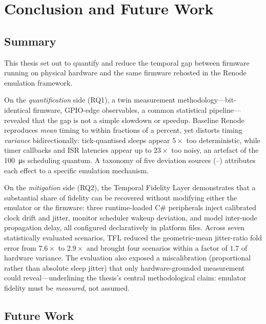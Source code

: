 \chapter{Conclusion and Future Work}
\label{ch:conclusion}

\section{Summary}
\label{sec:conclusion:summary}

This thesis set out to quantify and reduce the temporal gap between
firmware running on physical hardware and the same firmware rehosted in
the Renode emulation framework.

On the \emph{quantification} side (RQ1), a twin measurement
methodology---bit-identical firmware, GPIO-edge observables, a common
statistical pipeline---revealed that the gap is not a simple slowdown
or speedup. Baseline Renode reproduces \emph{mean} timing to within
fractions of a percent, yet distorts timing \emph{variance}
bidirectionally: tick-quantised sleeps appear $5\times$ too
deterministic, while timer callbacks and ISR latencies appear up to
$23\times$ too noisy, an artefact of the \SI{100}{\micro\second}
scheduling quantum. A taxonomy of five deviation sources
(--) attributes each effect to a specific emulation
mechanism.

On the \emph{mitigation} side (RQ2), the Temporal Fidelity Layer
demonstrates that a substantial share of fidelity can be recovered
without modifying either the emulator or the firmware: three
runtime-loaded C\# peripherals inject calibrated clock drift and
jitter, monitor scheduler wakeup deviation, and model inter-node
propagation delay, all configured declaratively in platform files.
Across seven statistically evaluated scenarios, TFL reduced the
geometric-mean jitter-ratio fold error from $7.6\times$ to $2.9\times$
and brought four scenarios within a factor of $1.7$ of hardware
variance. The evaluation also exposed a miscalibration (proportional
rather than absolute sleep jitter) that only hardware-grounded
measurement could reveal---underlining the thesis's central
methodological claim: emulator fidelity must be \emph{measured}, not
assumed.

\section{Future Work}
\label{sec:conclusion:future}

